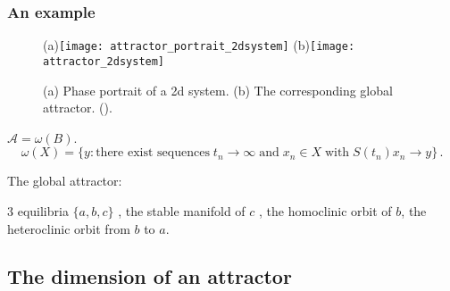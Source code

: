 \begin{frame}[shrink]%
  \frametitle{An example}

  \begin{figure}[h]
    \centering
    (a)\texttt{[image: attractor\_portrait\_2dsystem]}
    (b)\texttt{[image: attractor\_2dsystem]}
    \caption[The global attractor of a 2d system]{
      (a) Phase portrait of a 2d system.
      (b) The corresponding global attractor.
      (\cite{Robinson2001}).
    }
    \label{fig:attractor_portrait}
  \end{figure}
  {$\mathcal{A} = \omega(B)$.}
  \[
    \omega(X) = \{y :
    \text{there exist sequences}\; t_n\to\infty\;\text{and}\; x_n\in X \;
    \text{with}\; S(t_n)x_n\to y\}
    \,.
  \]

  \pause

  The global attractor:

  {\color{blue} 3 equilibria $\{a, b, c\}$ },
  {\color{cyan} the stable manifold of $c$ },
  {\color{blue} the homoclinic orbit of $b$},
  {\color{cyan} the   heteroclinic orbit from $b$ to $a$}.


\end{frame}

\subsection{The dimension of an attractor}

